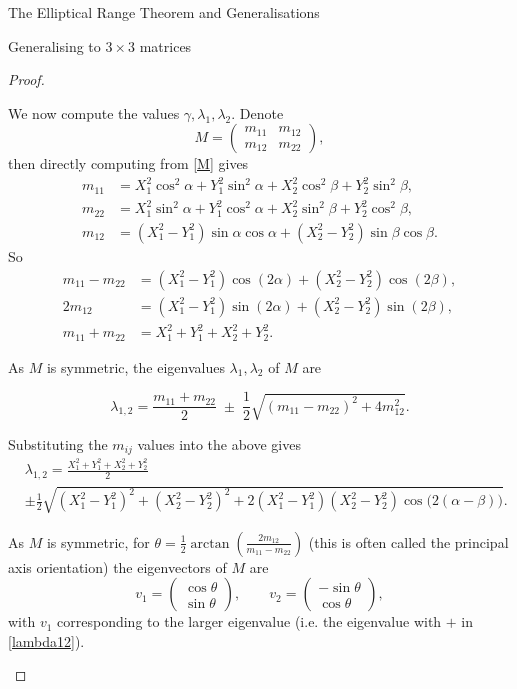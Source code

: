 \documentclass[12pt]{article}
\theoremstyle{plain}
\theoremstyle{definition}
\theoremstyle{remark}
\numberwithin{equation}{section}
\begin{document}
\begin{section}{The Elliptical Range Theorem and Generalisations}
\begin{subsection}{Generalising to $3 \times 3$ matrices}
\begin{proof}
\begin{enumerate}
We now compute the values $\gamma, \lambda_1, \lambda_2$. Denote
\[
M = \begin{pmatrix} m_{11} & m_{12} \\[2mm] m_{12} & m_{22} \end{pmatrix},
\]
then directly computing from \eqref{M} gives
\[
\begin{aligned}
m_{11} &= X_1^2 \cos^2\alpha + Y_1^2 \sin^2\alpha + X_2^2 \cos^2\beta + Y_2^2 \sin^2\beta,\\[1mm]
m_{22} &= X_1^2 \sin^2\alpha + Y_1^2 \cos^2\alpha + X_2^2 \sin^2\beta + Y_2^2 \cos^2\beta,\\[1mm]
m_{12} &= (X_1^2 - Y_1^2)\sin\alpha \cos\alpha + (X_2^2 - Y_2^2)\sin\beta \cos\beta.
\end{aligned}
\]
So
\[
\begin{aligned}
m_{11}-m_{22} &= (X_1^2 - Y_1^2)\cos(2\alpha) + (X_2^2 - Y_2^2)\cos(2\beta),\\[1mm]
2 m_{12} &= (X_1^2 - Y_1^2)\sin(2\alpha) + (X_2^2 - Y_2^2)\sin(2\beta),\\[1mm]
m_{11}+m_{22} &= X_1^2 + Y_1^2 + X_2^2 + Y_2^2.
\end{aligned}
\]

As $M$ is symmetric, the eigenvalues \(\lambda_1, \lambda_2\) of \(M\) are

\begin{equation}\label{lambda12}
    \lambda_{1,2} = \frac{m_{11}+m_{22}}{2} \;\pm\; \frac{1}{2}\sqrt{(m_{11}-m_{22})^2 + 4 m_{12}^2}.
\end{equation}

Substituting the $m_{ij}$ values into the above gives
\[
\begin{aligned}
&\lambda_{1,2} = \frac{X_1^2 + Y_1^2 + X_2^2 + Y_2^2}{2} \; \\
&\pm \frac{1}{2}\sqrt{(X_1^2-Y_1^2)^2 + (X_2^2-Y_2^2)^2 + 2(X_1^2-Y_1^2)(X_2^2-Y_2^2)\cos\big(2(\alpha-\beta)\big)}.
\end{aligned}
\]

As $M$ is symmetric, for $
\theta = \tfrac{1}{2}\arctan\!\left(\frac{2m_{12}}{m_{11}-m_{22}}\right)$ (this is often called the principal axis orientation)
the eigenvectors of $M$ are
\[
v_1 = \begin{pmatrix}
\cos\theta \\ 
\sin\theta
\end{pmatrix},
\qquad
v_2 = \begin{pmatrix}
-\sin\theta \\ 
\cos\theta
\end{pmatrix},
\]
with $v_1$ corresponding to the larger eigenvalue (i.e. the eigenvalue with $+$ in \eqref{lambda12}).




\end{enumerate}
\end{proof}
\end{subsection}
\end{section}
\end{document}
